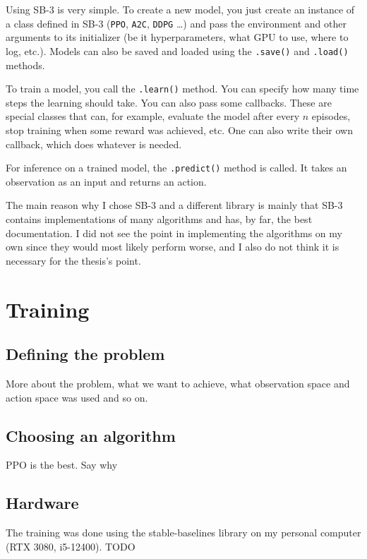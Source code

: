 \documentclass[
  digital,     %
  oneside,     %
  nosansbold,  %
  nocolorbold, %
  lof,         %
  lot,         %
]{fithesis4}
\begin{document}
Using SB-3 is very simple. To create a new model, you just create an instance of a class defined in SB-3 (\verb|PPO|, \verb|A2C|, \verb|DDPG| \ldots ) and pass the environment and other arguments to its initializer (be it hyperparameters, what GPU to use, where to log, etc.). Models can also be saved and loaded using the \verb|.save()| and \verb|.load()| methods.

To train a model, you call the \verb|.learn()| method. You can specify how many time steps the learning should take. You can also pass some callbacks. These are special classes that can, for example, evaluate the model after every $n$ episodes, stop training when some reward was achieved, etc. One can also write their own callback, which does whatever is needed.

For inference on a trained model, the \verb|.predict()| method is called. It takes an observation as an input and returns an action.

The main reason why I chose SB-3 and a different library is mainly that SB-3 contains implementations of many algorithms and has, by far, the best documentation. I did not see the point in implementing the algorithms on my own since they would most likely perform worse, and I also do not think it is necessary for the thesis's point.

\chapter{Training}

\section{Defining the problem}
More about the problem, what we want to achieve, what observation space and action space was used and so on.

\section{Choosing an algorithm}
PPO is the best. Say why

\section{Hardware}
The training was done using the stable-baselines library on my personal computer (RTX 3080, i5-12400). TODO
\end{document}
